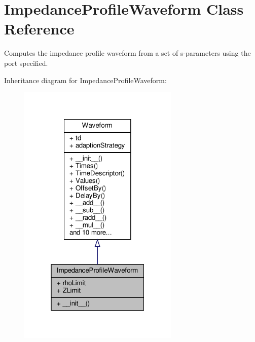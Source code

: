 \hypertarget{classSignalIntegrity_1_1ImpedanceProfile_1_1ImpedanceProfileWaveform_1_1ImpedanceProfileWaveform}{}\section{Impedance\+Profile\+Waveform Class Reference}
\label{classSignalIntegrity_1_1ImpedanceProfile_1_1ImpedanceProfileWaveform_1_1ImpedanceProfileWaveform}


Computes the impedance profile waveform from a set of s-\/parameters using the port specified.  




Inheritance diagram for Impedance\+Profile\+Waveform\+:\nopagebreak
\begin{figure}[H]
\begin{center}
\leavevmode
\includegraphics[width=217pt]{classSignalIntegrity_1_1ImpedanceProfile_1_1ImpedanceProfileWaveform_1_1ImpedanceProfileWaveform__inherit__graph}
\end{center}
\end{figure}


